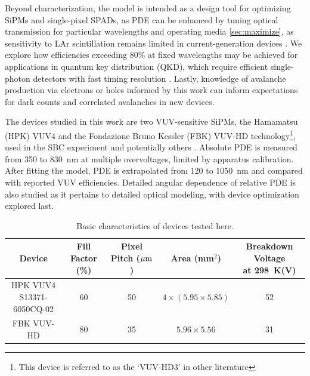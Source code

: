 Beyond characterization, the model is intended as a design tool for optimizing SiPMs and single-pixel SPADs, as PDE can be enhanced by tuning optical transmission for particular wavelengths and operating media \autoref{sec:maximize}, as sensitivity to LAr scintillation remains limited in current-generation devices \cite{carnesecchi_darkSide_light_2020}. We explore how efficiencies exceeding 80\% at fixed wavelengths may be achieved for applications in quantum key distribution (QKD), which require efficient single-photon detectors with fast timing resolution \cite{liao_satellite--ground_2017, hadfield_single-photon_2009,ara_shawkat_single_2023}. Lastly, knowledge of avalanche production via electrons or holes informed by this work can inform expectations for dark counts and correlated avalanches in new devices.

The devices studied in this work are two VUV-sensitive SiPMs, the Hamamatsu (HPK) VUV4 and the Fondazione Bruno Kessler (FBK) VUV-HD technology\footnote{This device is referred to as the `VUV-HD3' in other literature}, used in the SBC experiment \cite{sbc_snowmass2021, Herrera_vuv4_2024} and potentially others \cite{Borden_pdeTemp_2024, Wang_2021_cryo_sCurve}. Absolute PDE is measured from 350 to 830~nm at multiple overvoltages, limited by apparatus calibration. After fitting the model, PDE is extrapolated from 120 to 1050~nm and compared with reported VUV efficiencies. Detailed angular dependence of relative PDE is also studied as it pertains to detailed optical modeling, with device optimization explored last.

\begin{table}[h!]
\centering
\caption{Basic characteristics of devices tested here.}\smallskip
\setlength{\tabcolsep}{2.5pt}
\renewcommand{\arraystretch}{1.3}  %
{\scriptsize
\setlength{\tabcolsep}{5pt}
\renewcommand{\arraystretch}{1.3}
\begin{tabular}{|c|c|c|c|c|}
\hline
\textbf{Device} &
\makecell{\textbf{Fill Factor} \\ (\%)} &
\makecell{\textbf{Pixel Pitch} \\ ($\mu\text{m}$)} &
\makecell{\textbf{Area} \\ (mm$^2$)} &
\makecell{\textbf{Breakdown Voltage} \\ \textbf{at 298~K}(V)} \\
\hline
\makecell{HPK VUV4\\S13371-6050CQ-02}    & 60 & 50 & $4\times (5.95 \times 5.85)$     & 52 \\
FBK VUV-HD  & 80 & 35 & $5.96 \times 5.56$     & 31 \\
\hline
\end{tabular}
}
\label{tab:SiPM_parameters}
\end{table}
